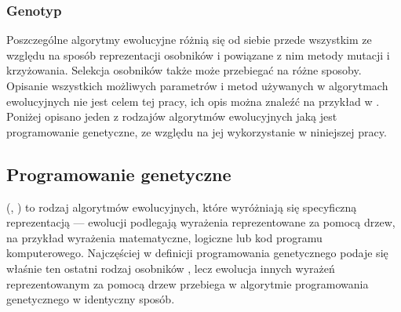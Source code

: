 \subsubsection{Genotyp}
Poszczególne algorytmy ewolucyjne różnią się od siebie przede wszystkim ze względu na sposób reprezentacji osobników i powiązane z nim metody mutacji i krzyżowania. Selekcja osobników także może przebiegać na różne sposoby. Opisanie wszystkich możliwych parametrów i metod używanych w algorytmach ewolucyjnych nie jest celem tej pracy, ich opis można znaleźć na przykład w \cite{Luke2009Metaheuristics}. Poniżej opisano jeden z rodzajów algorytmów ewolucyjnych jaką jest programowanie genetyczne, ze względu na jej wykorzystanie w niniejszej pracy.


\subsection{Programowanie genetyczne}

 (, ) to rodzaj algorytmów ewolucyjnych, które wyróżniają się specyficzną reprezentacją --- ewolucji podlegają wyrażenia reprezentowane za pomocą drzew, na przykład wyrażenia matematyczne, logiczne lub kod programu komputerowego. Najczęściej w definicji programowania genetycznego podaje się właśnie ten ostatni rodzaj osobników \cite{Luke2009Metaheuristics} \cite{Poli:2008:FGG:1796422}, lecz ewolucja innych wyrażeń reprezentowanym za pomocą drzew przebiega w algorytmie programowania genetycznego w identyczny sposób.

